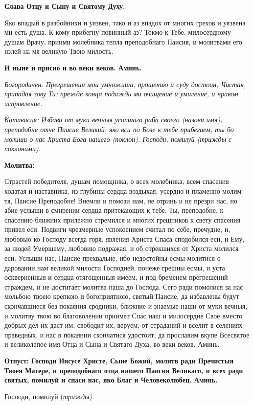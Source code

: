 \bfseries Слава Отцу и Сыну и Святому Духу\normalfont{}. 




Яко впадый в разбойники и уязвен, тако и аз впадох от многих грехов и уязвена ми есть душа. К кому прибегну повинный аз? Токмо к Тебе, милосердному душам Врачу, приими молебника тепла преподобнаго Паисия, и молитвами его излей на мя великую Твою милость. 




\bfseries И ныне и присно и во веки веков. Аминь\normalfont{}. 




\itshape Богородичен.\normalfont{} Прегрешении мои умножиша, прошению и суду достоин, Чистая, припадая зову Ти: прежде конца подаждь ми очищение и умиление, и нравом исправление.




\itshape Катавасия:\normalfont{} Избави от муки вечныя усопшаго раба своего (\itshape назови имя\normalfont{}), преподобне отче Паисие Великий, яко вси по Бозе к тебе прибегаем, ты бо молиши о нас Христа Бога нашего (\itshape поклон\normalfont{}). Господи, помилуй (\itshape трижды с поклонами\normalfont{}). 







\bfseries Молитва:\normalfont{}



Страстей победителя, душам помощника, о всех молебника, всем спасения ходатая и наставника, из глубины сердца воздыхая, усердно и пламенно молим тя, Паисие Преподобне! Внемли и помози нам, не отринь и не презри нас, но абие услыши в смирении сердца притекающих к тебе. Ты, преподобне, к спасению ближних прилежно стремился и многих грешников к свету спасения привел еси. Подвиги чрезмерные успокоением считал по себе, пречудне, и, любовью ко Господу всегда горя, явления Христа Спаса сподобился еси, и Ему, за людей Умершему, любовию подражая, и об отрекшихся от Христа молился еси. Услыши нас, Паисие прехвальне, ибо недостойны есмы молитися о даровании нам великой милости Господней, понеже грешны есмы, и уста оскверненныя и сердца отягощенныя имеем, и под бременем прегрешений страждем, и не достигает молитва наша до Господа. Сего ради помолися за нас мольбою твоею крепкою и богоприятною, святый Паисие, да избавлены будут скончавшиеся без покаяния сродники, ближние и знаемые наши от муки вечныя, и молитву твою во благоволении приимет Спас наш и милосердие Свое вместо добрых дел их даст им, свободит их, веруем, от страданий и вселит в селениях праведных, и нас в покаянии скончатися удостоит, да прославим вкупе Всесвятое и великолепое имя Отца и Сына и Святаго Духа, во веки веков. Аминь. 




\bfseries Отпуст:\normalfont{}
Господи Иисусе Христе, Сыне Божий, молитв ради Пречистыя Твоея Матере, и преподобнаго отца нашего Паисия Великаго, и всех ради святых, помилуй и спаси нас, яко Благ и Человеколюбец. Аминь. 


Господи, помилуй (\itshape трижды\normalfont{}). 